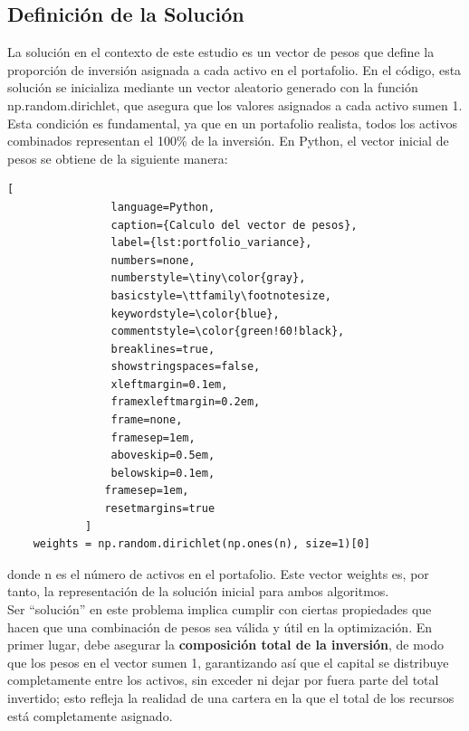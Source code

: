 \documentclass[9pt,a4paper,twoside]{rho-class/rho}
\begin{document}
        \subsection{Definición de la Solución}
            La solución en el contexto de este estudio es un vector de pesos que define la proporción de inversión asignada a cada activo en el portafolio. En el código, esta solución se inicializa mediante un vector aleatorio generado con la función np.random.dirichlet, que asegura que los valores asignados a cada activo sumen 1. Esta condición es fundamental, ya que en un portafolio realista, todos los activos combinados representan el 100\% de la inversión.
            En Python, el vector inicial de pesos se obtiene de la siguiente manera:

            \begin{lstlisting}[
                language=Python,
                caption={Calculo del vector de pesos},
                label={lst:portfolio_variance},
                numbers=none,
                numberstyle=\tiny\color{gray},
                basicstyle=\ttfamily\footnotesize,
                keywordstyle=\color{blue},
                commentstyle=\color{green!60!black},
                breaklines=true,
                showstringspaces=false,
                xleftmargin=0.1em,
                framexleftmargin=0.2em,
                frame=none,
                framesep=1em,
                aboveskip=0.5em,
                belowskip=0.1em,
               framesep=1em,
               resetmargins=true
            ]
    weights = np.random.dirichlet(np.ones(n), size=1)[0]
            \end{lstlisting}
            donde n es el número de activos en el portafolio. Este vector weights es, por tanto, la representación de la solución inicial para ambos algoritmos.\\
            Ser ``solución'' en este problema implica cumplir con ciertas propiedades que hacen que una combinación de pesos sea válida y útil en la optimización. En primer lugar, debe asegurar la \textbf{composición total de la inversión}, de modo que los pesos en el vector sumen 1, garantizando así que el capital se distribuye completamente entre los activos, sin exceder ni dejar por fuera parte del total invertido; esto refleja la realidad de una cartera en la que el total de los recursos está completamente asignado.
\end{document}
